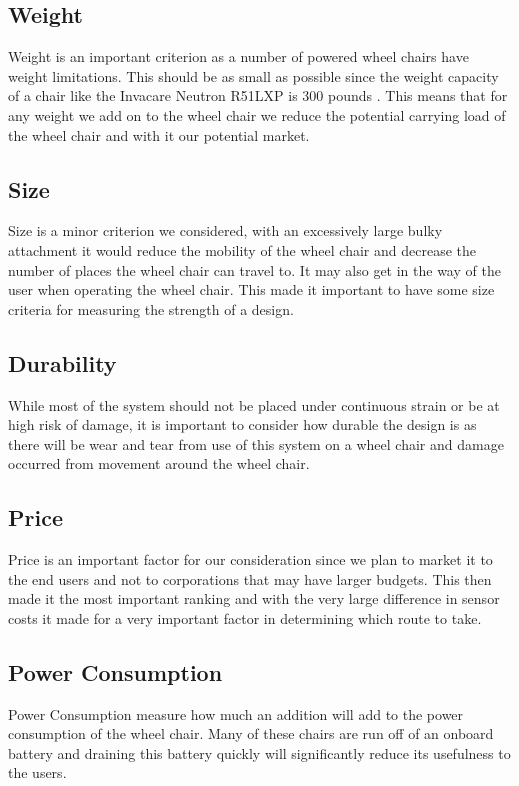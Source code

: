 \documentclass[oneside,final,a4paper]{report}
\begin{document}
\subsection{Weight}
Weight is an important criterion as a number of powered wheel chairs have weight limitations. This should be as small as possible since the weight capacity of a chair like the Invacare Neutron R51LXP is 300 pounds \cite{wheelchair_data}. This means that for any weight we add on to the wheel chair we reduce the potential carrying load of the wheel chair and with it our potential market.

\subsection{Size}
Size is a minor criterion we considered, with an excessively large bulky attachment it would reduce the mobility of the wheel chair and decrease the number of places the wheel chair can travel to. It may also get in the way of the user when operating the wheel chair. This made it important to have some size criteria for measuring the strength of a design.

\subsection{Durability}
While most of the system should not be placed under continuous strain or be at high risk of damage, it is important to consider how durable the design is as there will be wear and tear from use of this system on a wheel chair and damage occurred from movement around the wheel chair.

\subsection{Price}
Price is an important factor for our consideration since we plan to market it to the end users and not to corporations that may have larger budgets. This then made it the most important ranking and with the very large difference in sensor costs it made for a very important factor in determining which route to take.

\subsection{Power Consumption}
Power Consumption measure how much an addition will add to the power consumption of the wheel chair. Many of these chairs are run off of an onboard battery and draining this battery quickly will significantly reduce its usefulness to the users. 
\end{document}
